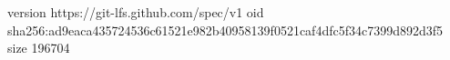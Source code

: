 version https://git-lfs.github.com/spec/v1
oid sha256:ad9eaca435724536c61521e982b40958139f0521caf4dfc5f34c7399d892d3f5
size 196704
